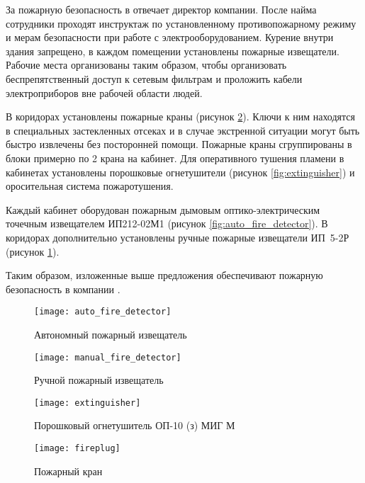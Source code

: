За пожарную безопасность в \yandexbel{} отвечает директор компании. После найма сотрудники проходят инструктаж по установленному противопожарному режиму и мерам безопасности при работе с электрооборудованием. Курение внутри здания запрещено, в каждом помещении установлены пожарные извещатели. Рабочие места организованы таким образом, чтобы организовать беспрепятственный доступ к сетевым фильтрам и проложить кабели электроприборов вне рабочей области людей.

В коридорах установлены пожарные краны (рисунок \ref{fig:fireplug}). Ключи к ним находятся в специальных застекленных отсеках и в случае экстренной ситуации могут быть быстро извлечены без посторонней помощи. Пожарные краны сгруппированы в блоки примерно по 2 крана на кабинет. Для оперативного тушения пламени в кабинетах установлены порошковые огнетушители (рисунок \ref{fig:extinguisher}) и оросительная система пожаротушения.

Каждый кабинет оборудован пожарным дымовым оптико-электрическим точечным извещателем \mbox{ИП212-02М1} (рисунок \ref{fig:auto_fire_detector}). В коридорах дополнительно установлены ручные пожарные извещатели \mbox{ИП 5-2Р} (рисунок \ref{fig:manual_fire_detector}).

Таким образом, изложенные выше предложения обеспечивают пожарную безопасность в компании \yandexbel{}.

\begin{figure}
  \begin{center}
    \texttt{[image: auto\_fire\_detector]}
    \caption{Автономный пожарный извещатель}
    \label{fig:auto_fire_detector}

    \vspace{0.05\textheight}

    \texttt{[image: manual\_fire\_detector]}
    \caption{Ручной пожарный извещатель}
    \label{fig:manual_fire_detector}
  \end{center}
\end{figure}

\begin{figure}
  \begin{center}
    \texttt{[image: extinguisher]}
    \caption{Порошковый огнетушитель \mbox{ОП-10} (з) МИГ М}
    \label{fig:extinguisher}

    \vspace{0.05\textheight}

    \texttt{[image: fireplug]}
    \caption{Пожарный кран}
    \label{fig:fireplug}
  \end{center}
\end{figure}